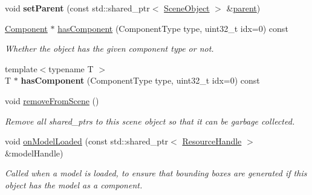 \begin{Indent}
\begin{DoxyCompactItemize}
void {\bfseries set\+Parent} (const std\+::shared\+\_\+ptr$<$ \mbox{\hyperlink{classrev_1_1_scene_object}{Scene\+Object}} $>$ \&\mbox{\hyperlink{classrev_1_1_scene_object_a51980b8993675edf967883dd6988dce8}{parent}})
\item 
\mbox{\hyperlink{classrev_1_1_component}{Component}} $\ast$ \mbox{\hyperlink{classrev_1_1_scene_object_a12a80db98267884d135fa7cada3d3194}{has\+Component}} (Component\+Type type, uint32\+\_\+t idx=0) const
\begin{DoxyCompactList}\small\item\em Whether the object has the given component type or not. \end{DoxyCompactList}\item 
\mbox{\label{classrev_1_1_scene_object_a17980ce66cc7e87d0c17c7e80c434435}} 
{\footnotesize template$<$typename T $>$ }\\T $\ast$ {\bfseries has\+Component} (Component\+Type type, uint32\+\_\+t idx=0) const
\item 
\mbox{\label{classrev_1_1_scene_object_a2ceb7d955897f715b9859f99a0af5f91}} 
void \mbox{\hyperlink{classrev_1_1_scene_object_a2ceb7d955897f715b9859f99a0af5f91}{remove\+From\+Scene}} ()
\begin{DoxyCompactList}\small\item\em Remove all shared\+\_\+ptrs to this scene object so that it can be garbage collected. \end{DoxyCompactList}\item 
\mbox{\label{classrev_1_1_scene_object_a77a296ff4cbd34d4e79d76728d3a566f}} 
void \mbox{\hyperlink{classrev_1_1_scene_object_a77a296ff4cbd34d4e79d76728d3a566f}{on\+Model\+Loaded}} (const std\+::shared\+\_\+ptr$<$ \mbox{\hyperlink{classrev_1_1_resource_handle}{Resource\+Handle}} $>$ \&model\+Handle)
\begin{DoxyCompactList}\small\item\em Called when a model is loaded, to ensure that bounding boxes are generated if this object has the model as a component. \end{DoxyCompactList}\end{DoxyCompactItemize}
\end{Indent}
